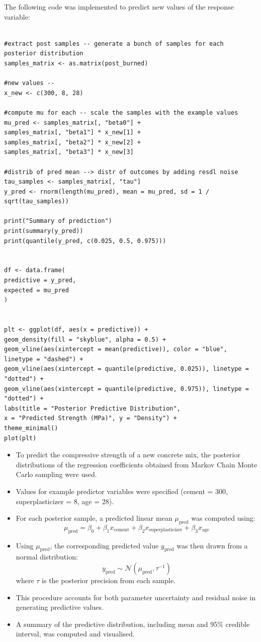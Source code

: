 \documentclass[]{article}
\begin{document}
The following code was implemented to predict new values of the response variable:

\begin{lstlisting}

#extract post samples -- generate a bunch of samples for each posterior distribution
samples_matrix <- as.matrix(post_burned)

#new values --
x_new <- c(300, 8, 28)

#compute mu for each -- scale the samples with the example values
mu_pred <- samples_matrix[, "beta0"] +
samples_matrix[, "beta1"] * x_new[1] +
samples_matrix[, "beta2"] * x_new[2] +
samples_matrix[, "beta3"] * x_new[3]

#distrib of pred mean --> distr of outcomes by adding resdl noise
tau_samples <- samples_matrix[, "tau"]
y_pred <- rnorm(length(mu_pred), mean = mu_pred, sd = 1 / sqrt(tau_samples))

print("Summary of prediction")
print(summary(y_pred))
print(quantile(y_pred, c(0.025, 0.5, 0.975)))


df <- data.frame(
predictive = y_pred,
expected = mu_pred
)


plt <- ggplot(df, aes(x = predictive)) +
geom_density(fill = "skyblue", alpha = 0.5) +
geom_vline(aes(xintercept = mean(predictive)), color = "blue", linetype = "dashed") +
geom_vline(aes(xintercept = quantile(predictive, 0.025)), linetype = "dotted") +
geom_vline(aes(xintercept = quantile(predictive, 0.975)), linetype = "dotted") +
labs(title = "Posterior Predictive Distribution",
x = "Predicted Strength (MPa)", y = "Density") +
theme_minimal()
plot(plt)
\end{lstlisting}


\begin{itemize}
	\item To predict the compressive strength of a new concrete mix, the posterior distributions of the regression coefficients obtained from Markov Chain Monte Carlo sampling were used.
	
	\item Values for example predictor variables were specified (cement = 300, superplasticizer = 8, age = 28).
	
	\item For each posterior sample, a predicted linear mean $\mu_{\text{pred}}$ was computed using:
	$$
	\mu_{\text{pred}} = \beta_0 + \beta_1 x_{\text{cement}} + \beta_2 x_{\text{superplasticizer}} + \beta_3 x_{\text{age}}
	$$
	
	\item Using $\mu_{\text{pred}}$, the corresponding predicted value $y_{\text{pred}}$ was then drawn from a normal distribution:
	$$
	y_{\text{pred}} \sim \mathcal{N}(\mu_{\text{pred}}, \tau^{-1})
	$$
	where $\tau$ is the posterior precision from each sample.
	\item This procedure accounts for both parameter uncertainty and residual noise in generating predictive values.
	\item A summary of the predictive distribution, including mean and 95\% credible interval, was computed and visualised.
\end{itemize}
\end{document}
